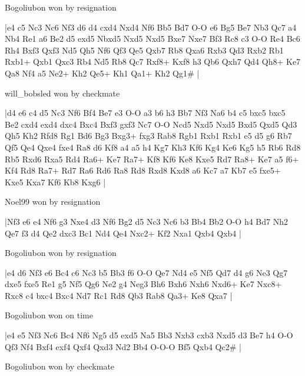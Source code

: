 \showboard

Bogoliubon won by resignation

\makegametitle
|e4 c5 Nc3 Nc6 Nf3 d6 d4 cxd4 Nxd4 Nf6 Bb5 Bd7 O-O e6 Bg5 Be7 Nb3 Qc7 a4 Nb4 Re1 a6 Be2 d5 exd5 Nbxd5 Nxd5 Nxd5 Bxe7 Nxe7 Bf3 Rc8 c3 O-O Re4 Bc6 Rh4 Bxf3 Qxf3 Nd5 Qh5 Nf6 Qf3 Qe5 Qxb7 Rb8 Qxa6 Rxb3 Qd3 Rxb2 Rb1 Rxb1+ Qxb1 Qxc3 Rb4 Nd5 Rb8 Qc7 Rxf8+ Kxf8 h3 Qb6 Qxh7 Qd4 Qh8+ Ke7 Qa8 Nf4 a5 Ne2+ Kh2 Qe5+ Kh1 Qa1+ Kh2 Qg1\#  |

\showboard

will\_bobsled won by checkmate

\makegametitle
|d4 e6 c4 d5 Nc3 Nf6 Bf4 Be7 e3 O-O a3 b6 h3 Bb7 Nf3 Na6 b4 c5 bxc5 bxc5 Be2 cxd4 exd4 dxc4 Bxc4 Bxf3 gxf3 Nc7 O-O Ncd5 Nxd5 Nxd5 Bxd5 Qxd5 Qd3 Qh5 Kh2 Rfd8 Rg1 Bd6 Bg3 Bxg3+ fxg3 Rab8 Rgb1 Rxb1 Rxb1 e5 d5 g6 Rb7 Qf5 Qe4 Qxe4 fxe4 Ra8 d6 Kf8 a4 a5 h4 Kg7 Kh3 Kf6 Kg4 Ke6 Kg5 h5 Rb6 Rd8 Rb5 Rxd6 Rxa5 Rd4 Ra6+ Ke7 Ra7+ Kf8 Kf6 Ke8 Kxe5 Rd7 Ra8+ Ke7 a5 f6+ Kf4 Rd8 Ra7+ Rd7 Ra6 Rd6 Ra8 Rd8 Rxd8 Kxd8 a6 Kc7 a7 Kb7 e5 fxe5+ Kxe5 Kxa7 Kf6 Kb8 Kxg6  |

\showboard

Noel99 won by resignation

\makegametitle
|Nf3 e6 e4 Nf6 g3 Nxe4 d3 Nf6 Bg2 d5 Nc3 Nc6 b3 Bb4 Bb2 O-O h4 Bd7 Nh2 Qe7 f3 d4 Qe2 dxc3 Bc1 Nd4 Qe4 Nxc2+ Kf2 Nxa1 Qxb4 Qxb4  |

\showboard

Bogoliubon won by resignation

\makegametitle
|e4 d6 Nf3 e6 Bc4 c6 Nc3 b5 Bb3 f6 O-O Qe7 Nd4 e5 Nf5 Qd7 d4 g6 Ne3 Qg7 dxe5 fxe5 Re1 g5 Nf5 Qg6 Ne2 g4 Neg3 Bh6 Bxh6 Nxh6 Nxd6+ Ke7 Nxc8+ Rxc8 c4 bxc4 Bxc4 Nd7 Rc1 Rd8 Qb3 Rab8 Qa3+ Ke8 Qxa7  |

\showboard

Bogoliubon won on time

\makegametitle
|e4 e5 Nf3 Nc6 Bc4 Nf6 Ng5 d5 exd5 Na5 Bb3 Nxb3 cxb3 Nxd5 d3 Be7 h4 O-O Qf3 Nf4 Bxf4 exf4 Qxf4 Qxd3 Nd2 Bb4 O-O-O Bf5 Qxb4 Qc2\#  |

\showboard

Bogoliubon won by checkmate

